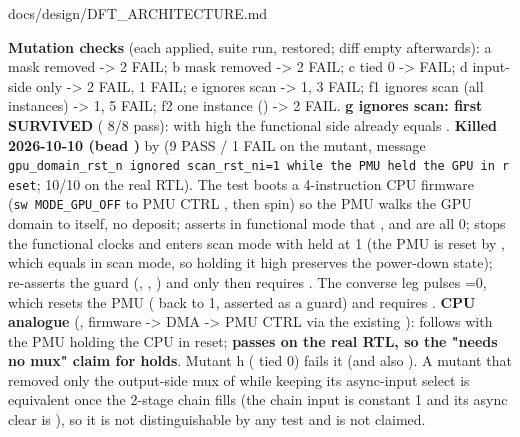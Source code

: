 \begin{relocated}{docs/design/DFT_ARCHITECTURE.md}
\begin{itemize}
  \textbf{Mutation checks} (each applied, suite run, restored; diff
  empty afterwards): a  mask removed -\textgreater{}
   2 FAIL; b  mask removed -\textgreater{}
   2 FAIL; c   tied 0
  -\textgreater{} 
  FAIL; d  input-side only -\textgreater{}
   2 FAIL,  1 FAIL; e
   ignores scan -\textgreater{}  1,
   3 FAIL; f1  ignores scan (all
  instances) -\textgreater{}  1,  5
  FAIL; f2 one instance () -\textgreater{}
   2 FAIL. \textbf{g  ignores
  scan: first SURVIVED} ( 8/8 pass): with
   high the functional side already equals
  . \textbf{Killed 2026-10-10 (bead )} by
   (9 PASS / 1
  FAIL on the mutant, message
  \texttt{gpu\_\allowbreak{}domain\_\allowbreak{}rst\_\allowbreak{}n\ ignored\ scan\_\allowbreak{}rst\_\allowbreak{}ni=\allowbreak{}1\ while\ the\ PMU\ held\ the\ GPU\ in\ reset};
  10/10 on the real RTL). The test boots a 4-instruction CPU firmware
  (\texttt{sw\ MODE\_\allowbreak{}GPU\_\allowbreak{}OFF} to PMU CTRL
  , then spin) so the PMU walks the GPU domain to
   itself, no deposit; asserts in functional mode that
  ,  and
   are all 0; stops the functional clocks and
  enters scan mode with  held at 1 (the PMU is reset
  by , which equals  in scan mode, so
  holding it high preserves the power-down state); re-asserts the guard
  (, ,
  ) and only then requires
  . The converse leg pulses
  =0, which resets the PMU ( back
  to 1, asserted as a guard) and requires .
  \textbf{CPU analogue} (,
  firmware -\textgreater{} DMA -\textgreater{} PMU CTRL
   via the existing ):
   follows  with the PMU
  holding the CPU in reset; \textbf{passes on the real RTL, so the
  "needs no mux" claim for  holds}. Mutant h
  ( tied 0) fails it (and also
  ). A mutant that removed only
  the output-side mux of  while keeping its
  async-input select is equivalent once the 2-stage chain fills (the
  chain input is constant 1 and its async clear is ),
  so it is not distinguishable by any test and is not claimed.
\end{itemize}


\end{relocated}
